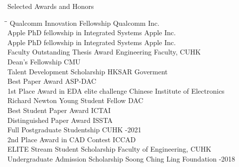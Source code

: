 
\begin{rSection}{Selected Awards and Honors}
\begin{tabbing}
\hspace{3.6in}\= \hspace{2.1in}\= \kill
Qualcomm Innovation Fellowship \> Qualcomm Inc.  \\
Apple PhD fellowship in Integrated Systems \> Apple Inc.  \\
Apple PhD fellowship in Integrated Systems \> Apple Inc.  \\
Faculty Outstanding Thesis Award \> Engineering Faculty, CUHK  \\
Dean's Fellowship \> CMU  \\
Talent Development Scholarship \> HKSAR Goverment  \\
Best Paper Award                       \> ASP-DAC                       \\
1st Place Award in EDA elite challenge\> Chinese Institute of Electronics  \\
Richard Newton Young Student Fellow    \> DAC  \\
Best Student Paper Award                       \> ICTAI                       \\
Distinguished Paper Award                      \>ISSTA                      \\
Full Postgraduate Studentship   \>CUHK  -2021\\
     2nd Place Award in CAD Contest               \> ICCAD                       \\
    ELITE Stream Student Scholarship                \> Faculty of Engineering, CUHK                             \\
    Undergraduate Admission Scholarship                             \> Soong Ching Ling Foundation  -2018 \\
\end{tabbing}
\end{rSection}

